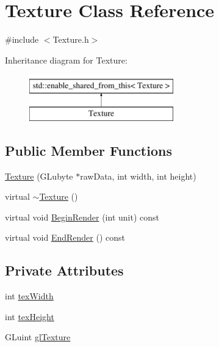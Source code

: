 \hypertarget{class_texture}{}\section{Texture Class Reference}
\label{class_texture}


{\ttfamily \#include $<$Texture.\+h$>$}

Inheritance diagram for Texture\+:\begin{figure}[H]
\begin{center}
\leavevmode
\includegraphics[height=2.000000cm]{class_texture}
\end{center}
\end{figure}
\subsection*{Public Member Functions}
\begin{DoxyCompactItemize}
\item 
\hyperlink{class_texture_ad2772674616f4956ba602d0853ca5585}{Texture} (G\+Lubyte $\ast$raw\+Data, int width, int height)
\item 
virtual \hyperlink{class_texture_a09c4bcb7462f64c1d20fa69dba3cee8a}{$\sim$\+Texture} ()
\item 
virtual void \hyperlink{class_texture_a2da54ce7444fbc74beccb8d17283be7e}{Begin\+Render} (int unit) const 
\item 
virtual void \hyperlink{class_texture_a8e6ec1266ead2dcd262b025f90e99838}{End\+Render} () const 
\end{DoxyCompactItemize}
\subsection*{Private Attributes}
\begin{DoxyCompactItemize}
\item 
int \hyperlink{class_texture_a3ce375542bd2d62f6e1793558c934373}{tex\+Width}
\item 
int \hyperlink{class_texture_ac9ce8215cc356702b12a05a05ae3029a}{tex\+Height}
\item 
G\+Luint \hyperlink{class_texture_adbf320788255a426a0a60e35cd969bcd}{gl\+Texture}
\end{DoxyCompactItemize}


